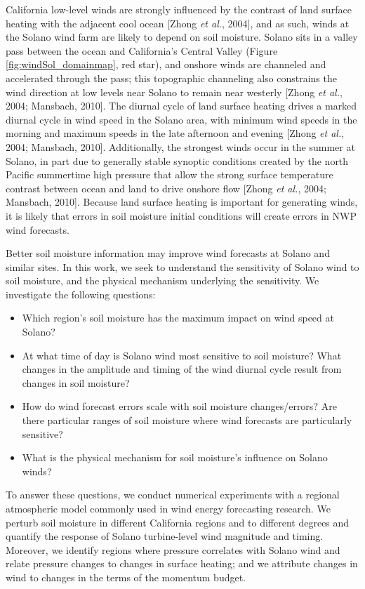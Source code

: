 California low-level winds are strongly influenced by the contrast of land surface heating with the adjacent cool ocean [Zhong \textit{et al.}, 2004], and as such, winds at the Solano wind farm are likely to depend on soil moisture.  Solano sits in a valley pass between the ocean and California's Central Valley (Figure \ref{fig:windSol_domainmap}, red star), and onshore winds are channeled and accelerated through the pass; this topographic channeling also constrains the wind direction at low levels near Solano to remain near westerly [Zhong \textit{et al.}, 2004; Mansbach, 2010].  The diurnal cycle of land surface heating drives a marked diurnal cycle in wind speed in the Solano area, with minimum wind speeds in the morning and maximum speeds in the late afternoon and evening [Zhong \textit{et al.}, 2004; Mansbach, 2010].  Additionally, the strongest winds occur in the summer at Solano, in part due to generally stable synoptic conditions created by the north Pacific summertime high pressure that allow the strong surface temperature contrast between ocean and land to drive onshore flow [Zhong \textit{et al.}, 2004; Mansbach, 2010]. Because land surface heating is important for generating winds, it is likely that errors in soil moisture initial conditions will create errors in NWP wind forecasts.

Better soil moisture information may improve wind forecasts at Solano and similar sites.  In this work, we seek to understand the sensitivity of Solano wind to soil moisture, and the physical mechanism underlying the sensitivity.  We investigate the following questions:
\begin{itemize}
\item Which region's soil moisture has the maximum impact on wind speed at Solano?
\item At what time of day is Solano wind most sensitive to soil moisture?  What changes in the amplitude and timing of the wind diurnal cycle result from changes in soil moisture?
\item How do wind forecast errors scale with soil moisture changes/errors?  Are there particular ranges of soil moisture where wind forecasts are particularly sensitive?
\item What is the physical mechanism for soil moisture's influence on Solano winds?
\end{itemize}

To answer these questions, we conduct numerical experiments with a regional atmospheric model commonly used in wind energy forecasting research.  We perturb soil moisture in different California regions and to different degrees and quantify the response of Solano turbine-level wind magnitude and timing.  Moreover, we identify regions where pressure correlates with Solano wind and relate pressure changes to changes in surface heating; and we attribute changes in wind to changes in the terms of the momentum budget.

